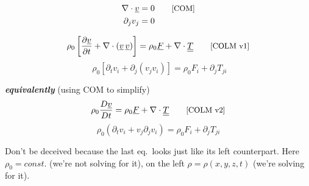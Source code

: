 \documentclass[12pt,landscape]{article}
\begin{document}
\begin{minipage}[t]{0.45\textwidth}
\section*{\centering{}}

\begin{align}
    \nabla\cdot \underline{v} &= 0 \tag*{\text{\small[COM]}}\\
    \partial_j v_j &= 0 \nonumber
\end{align}

\noindent\makebox[\linewidth]{\rule{\textwidth}{1pt}}

\begin{equation}
    \rho_0\left[\frac{\partial \underline{v}}{\partial t} + \nabla\cdot(\underline{v} \,\underline{v})\right] = \rho_0\underline{F} + \nabla\cdot\underline{\underline{T}}
    \tag*{\text{\small[COLM v1]}}
\end{equation}
\begin{equation*}
    \; \rho_0 \left[\partial_t v_i + \partial_j(v_j v_i)\right] = \rho_0 F_i + \partial_j T_{ji}
\end{equation*}

\textbf{\emph{equivalently}} (using COM to simplify)
\begin{equation}
    \rho_0\frac{D \underline{v}}{D t} = \rho_0\underline{F} + \nabla\cdot\underline{\underline{T}}
    \tag*{\text{\small[COLM v2]}}
\end{equation}
\begin{equation*}
    \rho_0 \left(\partial_t v_i + v_j\partial_j v_i\right) = \rho_0 F_i + \partial_j T_{ji}
\end{equation*}

\noindent\makebox[\linewidth]{\rule{\textwidth}{1pt}}

Don't be deceived because the last eq.\ looks just like its left counterpart. Here $\rho_0=const.$ (we're not solving for it), on the left $\rho = \rho(x,y,z,t)$ (we're solving for it).

\end{minipage}


\clearpage

\thispagestyle{fancy}
\end{document}
